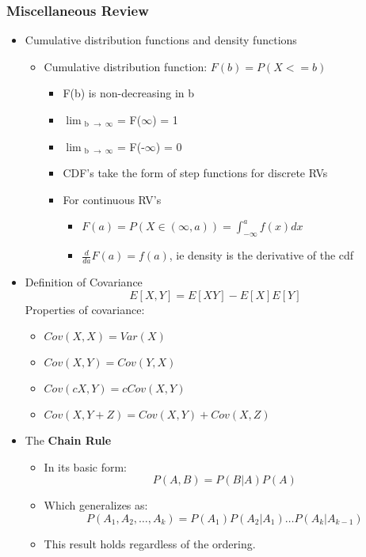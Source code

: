 \documentclass[12pt]{report}
\begin{document}
\subsubsection*{Miscellaneous Review}
\label{sec-1-1-9}
\begin{itemize}
\item Cumulative distribution functions and density functions
\label{sec-1-1-9-1}
\begin{itemize}
\item Cumulative distribution function: $F(b) = P(X<=b)$
\label{sec-1-1-9-1-1}
\begin{itemize}
\item F(b) is non-decreasing in b
\item $\lim$$_{\text{b }\to\ \infty}$ = F($\infty$) = 1
\item $\lim$$_{\text{b }\to\ \infty}$ = F(-$\infty$) = 0
\item CDF's take the form of step functions for discrete RVs
\item For continuous RV's
\begin{itemize}
\item $F(a)= P(X \in (\infty,a)) = \int_{-\infty}^a f(x) dx$
\item $\frac{d}{da} F(a) = f(a)$, ie density is the derivative of the cdf
\end{itemize}
\end{itemize}
\end{itemize}
\item Definition of Covariance
\label{sec-1-1-9-2}
$$E[X,Y]=E[XY]-E[X]E[Y]$$
Properties of covariance:
\begin{itemize}
\item $Cov(X,X)=Var(X)$
\item $Cov(X,Y)=Cov(Y,X)$
\item $Cov(cX,Y)=cCov(X,Y)$
\item $Cov(X,Y+Z)= Cov(X,Y)+Cov(X,Z)$
\end{itemize}
\item The \textbf{Chain Rule}
\label{sec-1-1-9-3}
\begin{itemize}
\item In its basic form:
\label{sec-1-1-9-3-1}
$$P(A,B) = P(B|A)P(A)$$
\item Which generalizes as:
\label{sec-1-1-9-3-2}
$$P(A_1,A_2,\ldots,A_k)=P(A_1)P(A_2|A_1)\ldots P(A_k|A_{k-1})$$
\item This result holds regardless of the ordering.
\label{sec-1-1-9-3-3}
\end{itemize}
\end{itemize}
\end{document}
